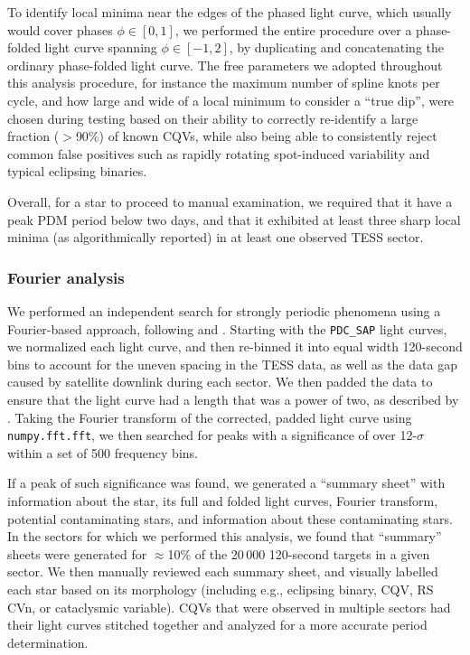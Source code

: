 \documentclass[11pt,twocolumn,tighten]{aastex63}
\begin{document}
To identify local minima near the edges of the phased light curve,
which usually would cover phases $\phi \in [ 0,1 ]$, we performed the
entire procedure over a phase-folded light curve spanning $\phi \in
[-1,2 ]$, by duplicating and concatenating the ordinary phase-folded
light curve.  The free parameters we adopted throughout this analysis
procedure, for instance the maximum number of spline knots per cycle,
and how large and wide of a local minimum to consider a ``true dip'',
were chosen during testing based on their ability to correctly
re-identify a large fraction ($>$90\%) of known CQVs, while also being
able to consistently reject common false positives such as rapidly
rotating spot-induced variability and typical eclipsing binaries.

Overall, for a star to proceed to manual examination, we required that
it have a peak PDM period below two days, and that it exhibited at
least three sharp local minima (as algorithmically reported) in at
least one observed TESS sector.



\subsubsection{Fourier analysis}
\label{subsec:fourier}

We performed an independent search for strongly periodic phenomena
using a Fourier-based approach, following \citet{2019ApJ...876..127Z}
and \citet[][their Section~1.3]{2023MNRAS.524.4220P}.  Starting with
the {\tt PDC\_SAP} light curves, we normalized each light curve, and
then re-binned it into equal width 120-second bins to account for the
uneven spacing in the TESS data, as well as the data gap caused by
satellite downlink during each sector.  We then padded the data to
ensure that the light curve had a length that was a power of two, as
described by \citeauthor{2019ApJ...876..127Z}.  Taking the Fourier
transform of the corrected, padded light curve using {\tt
numpy.fft.fft}, we then searched for peaks with a significance of over
12-$\sigma$ within a set of 500 frequency bins. 

If a peak of such significance was found, we generated a ``summary
sheet'' with information about the star, its full and folded light
curves, Fourier transform, potential contaminating stars, and
information about these contaminating stars.  In the sectors for which
we performed this analysis, we found that ``summary'' sheets were
generated for $\approx$10\% of the 20\,000 120-second targets in a
given sector.  We then manually reviewed each summary sheet, and
visually labelled each star based on its morphology (including e.g.,
eclipsing binary, CQV, RS CVn, or cataclysmic variable).  CQVs that
were observed in multiple sectors had their light curves stitched
together and analyzed for a more accurate period determination.
\end{document}
